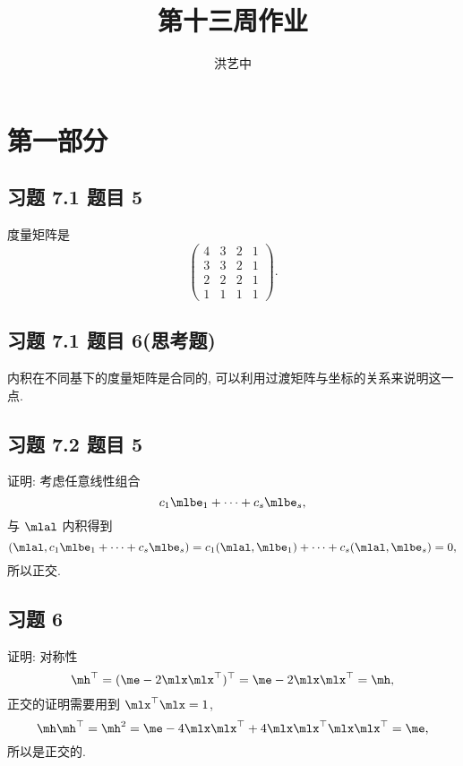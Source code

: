 \title{第十三周作业}
\author{洪艺中}
\maketitle
\section{第一部分}
\newcommand{\lvec}[1]{\overrightarrow{#1}}

\subsection*{ 习题 7.1 题目 5 }
\begin{solution}
度量矩阵是
\[
\begin{pmatrix}
    4 & 3 & 2 & 1 \\
    3 & 3 & 2 & 1 \\
    2 & 2 & 2 & 1 \\
    1 & 1 & 1 & 1
\end{pmatrix}.
\]
\end{solution}

\subsection*{ 习题 7.1 题目 6(思考题) }
\begin{solution}
内积在不同基下的度量矩阵是合同的, 可以利用过渡矩阵与坐标的关系来说明这一点.
\end{solution}

\subsection*{ 习题 7.2 题目 5 }
\begin{solution}
证明: 考虑任意线性组合
\[
c_1 \mlbe_1 + \cdots + c_s \mlbe_s, 
\]
与 $\mlal$ 内积得到
\[
(\mlal, c_1 \mlbe_1 + \cdots + c_s \mlbe_s) = c_1 (\mlal, \mlbe_1) + \cdots + c_s (\mlal, \mlbe_s) = 0,
\]
所以正交.
\end{solution}

\subsection*{ 习题 6 }
\begin{solution}
证明: 对称性
\[
\mh^\top = (\me - 2\mlx\mlx^\top)^\top = \me - 2\mlx\mlx^\top = \mh,
\]
正交的证明需要用到 $\mlx^\top\mlx = 1$,
\[
    \mh \mh^\top = \mh^2 = \me - 4\mlx\mlx^\top + 4\mlx\mlx^\top\mlx\mlx^\top = \me,
\]
所以是正交的.
\end{solution}

